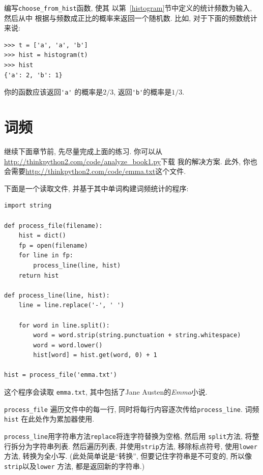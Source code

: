 \documentclass[10pt]{book}
\begin{document}
\begin{exercise}

编写\verb"choose_from_hist"函数, 使其
以第~\ref{histogram}节中定义的统计频数为输入, 然后从中
根据与频数成正比的概率来返回一个随机数. 
比如, 对于下面的频数统计来说:

\begin{verbatim}
>>> t = ['a', 'a', 'b']
>>> hist = histogram(t)
>>> hist
{'a': 2, 'b': 1}
\end{verbatim}
%
你的函数应该返回\verb"'a'" 的概率是$2/3$,  返回\verb"'b'"的概率是$1/3$.
\end{exercise}


\section{词频}

继续下面章节前, 先尽量完成上面的练习. 
你可以从 \url{http://thinkpython2.com/code/analyze_book1.py}下载
我的解决方案. 此外, 你也会需要\url{http://thinkpython2.com/code/emma.txt}这个文件.

下面是一个读取文件, 并基于其中单词构建词频统计的程序:

\begin{verbatim}
import string

def process_file(filename):
    hist = dict()
    fp = open(filename)
    for line in fp:
        process_line(line, hist)
    return hist

def process_line(line, hist):
    line = line.replace('-', ' ')
    
    for word in line.split():
        word = word.strip(string.punctuation + string.whitespace)
        word = word.lower()
        hist[word] = hist.get(word, 0) + 1

hist = process_file('emma.txt')
\end{verbatim}
%
这个程序会读取 {\tt emma.txt}, 其中包括了Jane Austen的{\em Emma}小说. 

\verb"process_file" 遍历文件中的每一行, 同时将每行内容逐次传给\verb"process_line". 
词频{\tt hist} 在此处作为累加器使用. 

\verb"process_line"用字符串方法{\tt replace}将连字符替换为空格, 然后用
 {\tt split}方法, 将整行拆分为字符串列表. 
然后遍历列表, 并使用{\tt strip}方法, 移除标点符号, 使用{\tt lower}方法, 
转换为全小写. (此处简单说是``转换'', 但要记住字符串是不可变的, 所以像
{\tt strip}以及{\tt lower} 方法, 都是返回新的字符串.)
\end{document}
